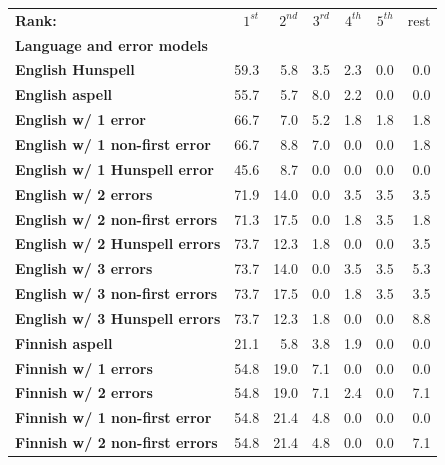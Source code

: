 \documentclass[a4paper,12pt]{article}
\begin{document}
\begin{table}
    \centering
    \begin{tabular}{|l|r|r|r|r|r|r|}
        \hline
        \bf Rank: & $1^{st}$ & $2^{nd}$ & $3^{rd}$ & $4^{th}$ & $5^{th}$ & rest \\
        \bf Language and error models &   &  &  &  &  &  \\
        \hline
        \bf English Hunspell & 59.3 & 5.8 & 3.5 & 2.3 & 0.0 & 0.0 \\
          \bf English aspell & 55.7 & 5.7 & 8.0 & 2.2 & 0.0 & 0.0 \\
        \hline
        \bf English w/ 1 error     & 66.7 & 7.0  & 5.2 & 1.8 & 1.8 & 1.8 \\
 \bf English w/ 1 non-first error  & 66.7 & 8.8  & 7.0 & 0.0 & 0.0 & 1.8 \\
 \bf English w/ 1 Hunspell error   & 45.6 & 8.7  & 0.0 & 0.0 & 0.0 & 0.0 \\
     \bf English w/ 2 errors       & 71.9 & 14.0 & 0.0 & 3.5 & 3.5 & 3.5 \\
 \bf English w/ 2 non-first errors & 71.3 & 17.5 & 0.0 & 1.8 & 3.5 & 1.8 \\
 \bf English w/ 2 Hunspell errors  & 73.7 & 12.3 & 1.8 & 0.0 & 0.0 & 3.5 \\
   \bf English w/ 3 errors         & 73.7 & 14.0 & 0.0 & 3.5 & 3.5 & 5.3 \\
 \bf English w/ 3 non-first errors & 73.7 & 17.5 & 0.0 & 1.8 & 3.5 & 3.5 \\
 \bf English w/ 3 Hunspell errors  & 73.7 & 12.3 & 1.8 & 0.0 & 0.0 & 8.8 \\
        \hline
       \bf Finnish aspell & 21.1 & 5.8 & 3.8 & 1.9 & 0.0 & 0.0 \\
        \bf Finnish w/ 1 errors & 54.8 & 19.0 & 7.1 & 0.0 & 0.0 & 0.0 \\
        \bf Finnish w/ 2 errors & 54.8 & 19.0 & 7.1 & 2.4 & 0.0 & 7.1 \\
\bf Finnish w/ 1 non-first error & 54.8 & 21.4 & 4.8 & 0.0 & 0.0 & 0.0 \\
\bf Finnish w/ 2 non-first errors & 54.8 & 21.4 & 4.8 & 0.0 & 0.0 & 7.1 \\

\end{tabular}
\end{table}
\end{document}
